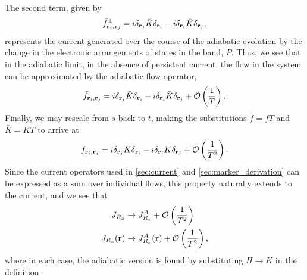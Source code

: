 The second term, given by
\begin{align}
    \bar f^\perp_{\textbf r_i, \textbf r_j} = i \delta_{\textbf r_j}\bar K\delta_{\textbf r_i }-i\delta_{\textbf r_i}\bar K\delta_{ \textbf r_j },
\end{align}
represents the current generated over the course of the adiabatic evolution by the change in the electronic arrangements of states in the band, $P$. Thus, we see that in the adiabatic limit, in the absence of persistent current, the flow in the system can be approximated by the adiabatic flow operator,
\begin{align}
    \bar f_{\textbf r_i, \textbf r_j} = i \delta_{\textbf r_j}\bar K\delta_{\textbf r_i }-i\delta_{\textbf r_i}\bar K\delta_{ \textbf r_j } + \mathcal O \left( \frac{1}{T} \right ).
\end{align}
Finally, we may rescale from $s$ back to $t$, making the substitutions $\bar f = f T$ and $\bar K = K T$ to arrive at
\begin{align}
    f_{\textbf r_i, \textbf r_j} = i \delta_{\textbf r_j} K\delta_{\textbf r_i }-i\delta_{\textbf r_i} K\delta_{ \textbf r_j } + \mathcal O \left( \frac{1}{T^2} \right ).
\end{align}
Since the current operators used in \textsection\ref{sec:current} and \textsection\ref{sec:marker_derivation} can be expressed as a sum over individual flows, this property naturally extends to the current, and we see that
\begin{align}
    J_{R_x} &\rightarrow J^A_{R_x} + \mathcal O \left( \frac{1}{T^2} \right ) \\
    J_{R_x}(\textbf r) &\rightarrow J^A_{R_x}(\textbf r) + \mathcal O \left( \frac{1}{T^2} \right ),
\end{align}
where in each case, the adiabatic version is found by substituting $H \rightarrow K$ in the definition.

